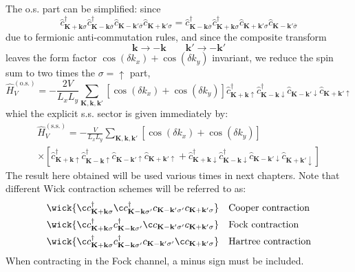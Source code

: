The o.s. part can be simplified: since
\[
	\hat c_{\mathbf{K}+\mathbf{k} \sigma}^\dagger \hat c_{\mathbf{K}-\mathbf{k}\overline{\sigma}}^\dagger \hat c_{\mathbf{K}-\mathbf{k}'\overline{\sigma}} \hat c_{\mathbf{K}+\mathbf{k}'\sigma} = \hat c_{\mathbf{K}-\mathbf{k}\overline{\sigma}}^\dagger \hat c_{\mathbf{K}+\mathbf{k} \sigma}^\dagger \hat c_{\mathbf{K}+\mathbf{k}'\sigma} \hat c_{\mathbf{K}-\mathbf{k}'\overline{\sigma}} 
\]
due to fermionic anti-commutation rules, and since the composite transform
\[
	\mathbf{k} \to -\mathbf{k}
	\qquad
	\mathbf{k}' \to -\mathbf{k}'	
\]
leaves the form factor $\cos \left( \delta k_x \right)	+ \cos \left( \delta k_y \right)$ invariant, we reduce the spin sum to two times the $\sigma=\uparrow$ part,
\begin{equation}\label{eq:HV-os-fourier}
	\hat H_V^{(\mathrm{o.s.})} = - \frac{2V}{L_x L_y}
	\sum_{\mathbf{K}, \mathbf{k}, \mathbf{k}'} \left[
		\cos \left(
			\delta k_x
		\right)	+ \cos \left(
			\delta k_y
		\right)	
	\right]	\hat c_{\mathbf{K}+\mathbf{k} \uparrow}^\dagger \hat c_{\mathbf{K}-\mathbf{k}\downarrow}^\dagger \hat c_{\mathbf{K}-\mathbf{k}'\downarrow} \hat c_{\mathbf{K}+\mathbf{k}'\uparrow}
\end{equation}
whiel the explicit s.s. sector is given immediately by:
\begin{multline}\label{eq:HV-ss-fourier}
	\hat H_V^{(\mathrm{s.s.})} = - \frac{V}{L_x L_y}
	\sum_{\mathbf{K}, \mathbf{k}, \mathbf{k}'} \left[
	\cos \left(
	\delta k_x
	\right)	+ \cos \left(
	\delta k_y
	\right)	
	\right]\\
	\times \left[
	\hat c_{\mathbf{K}+\mathbf{k} \uparrow}^\dagger \hat c_{\mathbf{K}-\mathbf{k}\uparrow}^\dagger \hat c_{\mathbf{K}-\mathbf{k}'\uparrow} \hat c_{\mathbf{K}+\mathbf{k}'\uparrow} + \hat c_{\mathbf{K}+\mathbf{k} \downarrow}^\dagger \hat c_{\mathbf{K}-\mathbf{k}\downarrow}^\dagger \hat c_{\mathbf{K}-\mathbf{k}'\downarrow} \hat c_{\mathbf{K}+\mathbf{k}'\downarrow}
	\right]
\end{multline}
The result here obtained will be used various times in next chapters. Note that different Wick contraction schemes will be referred to as:
\begin{align}
	&\wick{
		\c
		c_{\mathbf{K}+\mathbf{k} \sigma}^\dagger 
		\c
		c_{\mathbf{K}-\mathbf{k} \sigma'}^\dagger c_{\mathbf{K}-\mathbf{k}' \sigma'} c_{\mathbf{K}+\mathbf{k}'\sigma}
	} &&\text{Cooper contraction} \label{eq:reciprocal-space-cooper-contraction} \\
	&\wick{
		\c
		c_{\mathbf{K}+\mathbf{k} \sigma}^\dagger 
		c_{\mathbf{K}-\mathbf{k} \sigma'}^\dagger
		\c
		c_{\mathbf{K}-\mathbf{k}' \sigma'} c_{\mathbf{K}+\mathbf{k}'\sigma}
	} &&\text{Fock contraction} \label{eq:reciprocal-space-fock-contraction} \\
	&\wick{
		\c
		c_{\mathbf{K}+\mathbf{k} \sigma}^\dagger 
		c_{\mathbf{K}-\mathbf{k} \sigma'}^\dagger c_{\mathbf{K}-\mathbf{k}' \sigma'}
		\c
		c_{\mathbf{K}+\mathbf{k}'\sigma}
	} &&\text{Hartree contraction} \label{eq:reciprocal-space-hartree-contraction}
\end{align}
When contracting in the Fock channel, a minus sign must be included.

